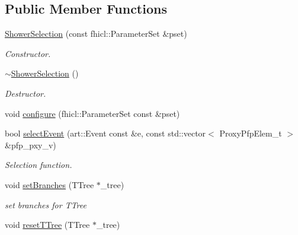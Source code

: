 \subsection*{Public Member Functions}
\begin{DoxyCompactItemize}
\item 
\hyperlink{classselection_1_1ShowerSelection_a07b97cd199fb1eba72923555c4d05ec7}{Shower\+Selection} (const fhicl\+::\+Parameter\+Set \&pset)
\begin{DoxyCompactList}\small\item\em Constructor. \end{DoxyCompactList}\item 
\hyperlink{classselection_1_1ShowerSelection_a59328cc3ca5b6875244f1d2c6a2f3b8e}{$\sim$\+Shower\+Selection} ()\hypertarget{classselection_1_1ShowerSelection_a59328cc3ca5b6875244f1d2c6a2f3b8e}{}\label{classselection_1_1ShowerSelection_a59328cc3ca5b6875244f1d2c6a2f3b8e}

\begin{DoxyCompactList}\small\item\em Destructor. \end{DoxyCompactList}\item 
void \hyperlink{classselection_1_1ShowerSelection_a723729db901f048f4fcb5501895305eb}{configure} (fhicl\+::\+Parameter\+Set const \&pset)
\item 
bool \hyperlink{classselection_1_1ShowerSelection_aa538b905ab6e8a329acf3eaa97cc0af9}{select\+Event} (art\+::\+Event const \&e, const std\+::vector$<$ Proxy\+Pfp\+Elem\+\_\+t $>$ \&pfp\+\_\+pxy\+\_\+v)
\begin{DoxyCompactList}\small\item\em Selection function. \end{DoxyCompactList}\item 
void \hyperlink{classselection_1_1ShowerSelection_a1ea09a0f7da6a3e7b9f1eb9728bff1cf}{set\+Branches} (T\+Tree $\ast$\+\_\+tree)\hypertarget{classselection_1_1ShowerSelection_a1ea09a0f7da6a3e7b9f1eb9728bff1cf}{}\label{classselection_1_1ShowerSelection_a1ea09a0f7da6a3e7b9f1eb9728bff1cf}

\begin{DoxyCompactList}\small\item\em set branches for T\+Tree \end{DoxyCompactList}\item 
void \hyperlink{classselection_1_1ShowerSelection_a9d35d47af8468781d97c4e872c96d768}{reset\+T\+Tree} (T\+Tree $\ast$\+\_\+tree)\hypertarget{classselection_1_1ShowerSelection_a9d35d47af8468781d97c4e872c96d768}{}\label{classselection_1_1ShowerSelection_a9d35d47af8468781d97c4e872c96d768}


\end{DoxyCompactItemize}
